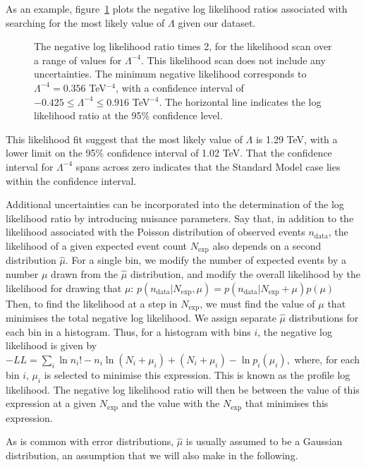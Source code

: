 As an example, figure~\ref{exllr} plots the negative log likelihood ratios associated with searching for the most likely value of $\Lambda$ given our dataset.

\begin{figure}[htp]
\begin{minipage}[b]{.69\textwidth}
\begin{infilsf} \tiny

\end{infilsf}
\end{minipage}
\begin{minipage}[b]{.3\textwidth}
\caption{The negative log likelihood ratio times 2, for the likelihood scan over a range of values for $\Lambda^{-4}$. This likelihood scan does not include any uncertainties. The minimum negative likelihood corresponds to $\Lambda^{-4}=0.356$ TeV$^{-4}$, with a confidence interval of $-0.425 \le \Lambda^{-4} \le 0.916$ TeV$^{-4}$. The horizontal line indicates the log likelihood ratio at the 95\% confidence level.}\label{exllr}
\end{minipage}
\end{figure}

This likelihood fit suggest that the most likely value of $\Lambda$ is 1.29 TeV, with a lower limit on the 95\% confidence interval of 1.02 TeV. That the confidence interval for $\Lambda^{-4}$ spans across zero indicates that the Standard Model case lies within the confidence interval.

\begin{edits}
Additional uncertainties can be incorporated into the determination of the log likelihood ratio by introducing nuisance parameters. Say that, in addition to the likelihood associated with the Poisson distribution of observed events $n_\text{data}$, the likelihood of a given expected event count $N_\text{exp}$ also depends on a second distribution $\hat\mu$. For a single bin, we modify the number of expected events by a number $\mu$ drawn from the $\hat\mu$ distribution, and modify the overall likelihood by the likelihood for drawing that $\mu$:
\(p(n_\text{data}|N_\text{exp},\mu)=p(n_\text{data}|N_\text{exp}+\mu)p(\mu)\)
Then, to find the likelihood at a step in $N_\text{exp}$, we must find the value of $\mu$ that minimises the total negative log likelihood. We assign separate $\hat\mu$ distributions for each bin in a histogram. Thus, for a histogram with bins $i$, the negative log likelihood is given by
\(-LL=\sum_i\ln n_i!-n_i\ln(N_i+\mu_i)+(N_i+\mu_i)-\ln p_i(\mu_i),\)
where, for each bin $i$, $\mu_i$ is selected to minimise this expression. This is known as the profile log likelihood. The negative log likelihood ratio will then be between the value of this expression at a given $N_\text{exp}$ and the value with the $N_\text{exp}$ that minimises this expression.

As is common with error distributions, $\hat\mu$ is usually assumed to be a Gaussian distribution, an assumption that we will also make in the following.
\end{edits}

